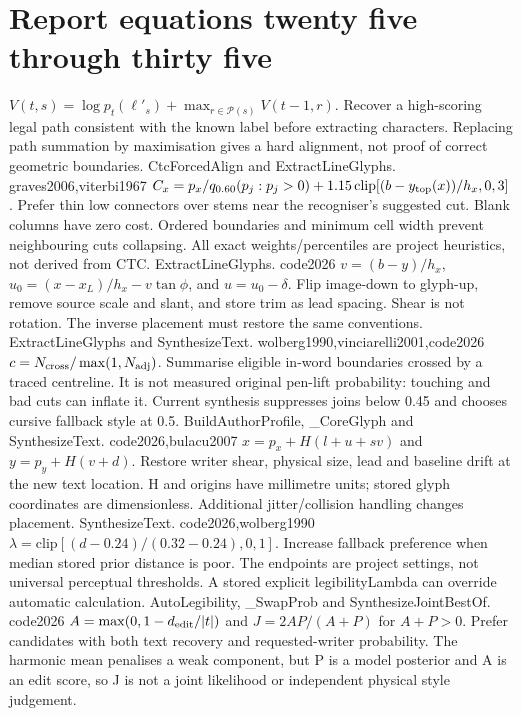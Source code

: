 \section{Report equations twenty five through thirty five}
{$V(t,s)=\log p_t(\ell'_s)+\max_{r\in\mathcal P(s)}V(t-1,r)$.}
{Recover a high-scoring legal path consistent with the known label before
extracting characters. Replacing path summation by maximisation gives a hard
alignment, not proof of correct geometric boundaries.}
{CtcForcedAlign and ExtractLineGlyphs.}
{graves2006,viterbi1967}
{$C_x=p_x/q_{0.60}(p_j:p_j>0)+1.15\,\mathrm{clip}[(b-y_{\rm top}(x))/h_x,0,3]$.}
{Prefer thin low connectors over stems near the recogniser's suggested cut.
Blank columns have zero cost. Ordered boundaries and minimum cell width
prevent neighbouring cuts collapsing. All exact weights/percentiles are
project heuristics, not derived from CTC.}
{ExtractLineGlyphs.}
{code2026}
{$v=(b-y)/h_x$, $u_0=(x-x_L)/h_x-v\tan\phi$, and $u=u_0-\delta$.}
{Flip image-down to glyph-up, remove source scale and slant, and store trim
as lead spacing. Shear is not rotation. The inverse placement must restore
the same conventions.}
{ExtractLineGlyphs and SynthesizeText.}
{wolberg1990,vinciarelli2001,code2026}
{$c=N_{\rm cross}/\max(1,N_{\rm adj})$.}
{Summarise eligible in-word boundaries crossed by a traced centreline. It is
not measured original pen-lift probability: touching and bad cuts can inflate
it. Current synthesis suppresses joins below 0.45 and chooses cursive fallback
style at 0.5.}
{BuildAuthorProfile, \_CoreGlyph and SynthesizeText.}
{code2026,bulacu2007}
{$x=p_x+H(l+u+sv)$ and $y=p_y+H(v+d)$.}
{Restore writer shear, physical size, lead and baseline drift at the new
text location. H and origins have millimetre units; stored glyph coordinates
are dimensionless. Additional jitter/collision handling changes placement.}
{SynthesizeText.}
{code2026,wolberg1990}
{$\lambda=\mathrm{clip}[(d-0.24)/(0.32-0.24),0,1]$.}
{Increase fallback preference when median stored prior distance is poor.
The endpoints are project settings, not universal perceptual thresholds.
A stored explicit legibilityLambda can override automatic calculation.}
{AutoLegibility, \_SwapProb and SynthesizeJointBestOf.}
{code2026}
{$A=\max(0,1-d_{\rm edit}/|t|)$ and $J=2AP/(A+P)$ for $A+P>0$.}
{Prefer candidates with both text recovery and requested-writer probability.
The harmonic mean penalises a weak component, but P is a model posterior
and A is an edit score, so J is not a joint likelihood or independent physical
style judgement.}
